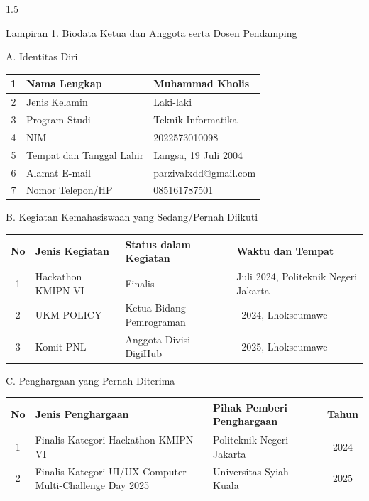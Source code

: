 \documentclass[12pt, a4paper, onecolumn, oneside]{report}
\begin{document}
\begin{spacing}{1.5}
\setlength{\parindent}{0pt}

\vspace{0.2cm}
\noindent Lampiran 1. Biodata Ketua dan Anggota serta Dosen Pendamping

\vspace{0.3cm}
\noindent A. Identitas Diri

\vspace{0.1cm}
\begin{tabularx}{\textwidth}{|c|>{\raggedright\arraybackslash}p{5.5cm}|X|}
\hline
1 & Nama Lengkap & Muhammad Kholis \\
\hline
2 & Jenis Kelamin & Laki-laki \\
\hline
3 & Program Studi & Teknik Informatika \\
\hline
4 & NIM & 2022573010098 \\
\hline
5 & Tempat dan Tanggal Lahir & Langsa, 19 Juli 2004 \\
\hline
6 & Alamat E-mail & parzivalxdd@gmail.com \\
\hline
7 & Nomor Telepon/HP & 085161787501 \\
\hline
\end{tabularx}

\vspace{0.2cm}
\noindent B. Kegiatan Kemahasiswaan yang Sedang/Pernah Diikuti

\vspace{0.1cm}
\begin{tabularx}{\textwidth}{|c|X|>{\raggedright\arraybackslash}p{3.8cm}|>{\raggedright\arraybackslash}p{3.8cm}|}
\hline
\rowcolor{lightgray}No & Jenis Kegiatan & Status dalam Kegiatan & Waktu dan Tempat \\
\hline
1 & Hackathon KMIPN VI & Finalis & 01 Juli 2024, Politeknik Negeri Jakarta \\
\hline
2 & UKM POLICY & Ketua Bidang Pemrograman & 2023--2024, Lhokseumawe \\
\hline
3 & Komit PNL & Anggota Divisi DigiHub & 2024--2025, Lhokseumawe \\
\hline
\end{tabularx}

\vspace{0.2cm}
\noindent C. Penghargaan yang Pernah Diterima

\vspace{0.1cm}
\begin{tabularx}{\textwidth}{|c|X|>{\raggedright\arraybackslash}p{4.0cm}|c|}
\hline
\rowcolor{lightgray}No & Jenis Penghargaan & Pihak Pemberi Penghargaan & Tahun \\
\hline
1 & Finalis Kategori Hackathon KMIPN VI & Politeknik Negeri Jakarta & 2024 \\
\hline
2 & Finalis Kategori UI/UX Computer Multi-Challenge Day 2025 & Universitas Syiah Kuala & 2025 \\
\hline
\end{tabularx}


\end{spacing}
\end{document}
